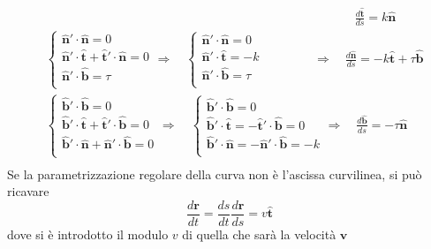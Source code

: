 \begin{equation}
\begin{aligned}
& \qquad \qquad \qquad \qquad \qquad \qquad \qquad \qquad 
  \qquad \qquad \qquad \qquad \quad
 \frac{d \bm{\hat{t}}}{ds} = k \bm{\hat{n}} \\
& \begin{cases}
 \bm{\hat{n}}'\cdot \bm{\hat{n}} = 0 \\
 \bm{\hat{n}}'\cdot \bm{\hat{t}}+\bm{\hat{t}}'\cdot \bm{\hat{n}} = 0 \\
 \bm{\hat{n}}'\cdot \bm{\hat{b}} = \tau \\
 \end{cases} \Rightarrow \quad
 \begin{cases}
 \bm{\hat{n}}'\cdot \bm{\hat{n}} = 0   \\
 \bm{\hat{n}}'\cdot \bm{\hat{t}} = -k  \\
 \bm{\hat{n}}'\cdot \bm{\hat{b}} = \tau \\
 \end{cases} \qquad \quad \quad \Rightarrow \quad 
  \frac{d \bm{\hat{n}}}{ds} = - k \bm{\hat{t}} + \tau \bm{\hat{b}} \\
& \begin{cases}
 \bm{\hat{b}}'\cdot \bm{\hat{b}} = 0 \\
 \bm{\hat{b}}'\cdot \bm{\hat{t}} + \bm{\hat{t}}'\cdot \bm{\hat{b}} = 0 \\
 \bm{\hat{b}}'\cdot \bm{\hat{n}} + \bm{\hat{n}}'\cdot \bm{\hat{b}} = 0 \\
 \end{cases} \Rightarrow \quad
 \begin{cases}
 \bm{\hat{b}}'\cdot \bm{\hat{b}} = 0 \\
 \bm{\hat{b}}'\cdot \bm{\hat{t}} = -\bm{\hat{t}}'\cdot \bm{\hat{b}} = 0 \\
 \bm{\hat{b}}'\cdot \bm{\hat{n}} = -\bm{\hat{n}}'\cdot \bm{\hat{b}} = -k\\
 \end{cases} \Rightarrow \quad
  \frac{d \bm{\hat{b}}}{ds} = - \tau \bm{\hat{n}} \\
\end{aligned}
\end{equation}
%
Se la parametrizzazione regolare della curva non è l'ascissa curvilinea,
 si può ricavare
\begin{equation}
 \frac{d\bm{r}}{dt} = \frac{ds}{dt}\frac{d\bm{r}}{ds} = 
  v \bm{\hat{t}}
\end{equation}
dove si è introdotto il modulo $v$ di quella che sarà la velocità $\bm{v}$
